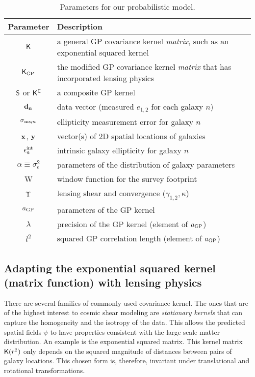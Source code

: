 \begin{table}%
\begin{center}
\caption{Parameters for our probabilistic model.}
\label{tab:sampling_parameters}
\begin{tabular}{cl}
\hline
Parameter & Description \\
\hline
$\mathsf{K}$ & a general GP covariance kernel {\it matrix}, such as an exponential squared kernel \\
$\mathsf{K}_{\rm GP}$  & the modified GP covariance kernel {\it matrix} that has incorporated
lensing physics\\
$\mathsf{S}$ or $\mathsf{K}^{\mathsf{C}}$ & a composite GP kernel \\
${\bf d_{n}}$ & data vector (measured $e_{1,2}$ for each galaxy $n$)  \\
$\sigma_{{\rm ms}; n}$ & ellipticity measurement error for galaxy $n$ 
\\
$\mathbf{x}$, $\mathbf{y}$ & vector(s) of 2D spatial locations of galaxies \\
$\epsilon_n^{\rm int}$ & intrinsic galaxy ellipticity for galaxy $n$ \\
$\alpha\equiv\sigma_{e}^2$ & parameters of the distribution of galaxy parameters \\
W & window function for the survey footprint \\
$\Upsilon$ & lensing shear and convergence ($\gamma_{1,2}, \kappa$) \\
$a_{\rm GP}$ & parameters of the GP kernel\\
$\lambda$ & precision of the GP kernel (element of $a_{\rm GP}$) \\
$l^2$ & squared GP correlation length (element of $a_{\rm GP}$) \\
\hline
\end{tabular}
\end{center}
\end{table}
\subsection{Adapting the exponential squared kernel (matrix function) with lensing physics}
There are several families of commonly used covariance kernel.
The ones that are of the highest interest to cosmic shear modeling 
are {\it stationary kernels} that can capture 
the homogeneity and the isotropy of the data. This allows the predicted spatial fields
$\psi$ to have properties consistent with the large-scale matter distribution.
An example is the exponential squared matrix.
This kernel matrix $\mathsf{K}(r^2)$ only depends on the
squared magnitude of distances between pairs of galaxy locations. 
This chosen form is, therefore, invariant
under translational and rotational transformations.

